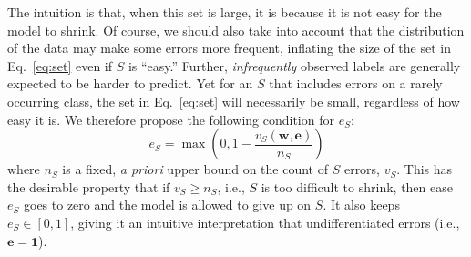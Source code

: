 \documentclass{article} %
\begin{document}
The intuition is that, when this set is large, it is because it is not easy for the
model to shrink.  Of course, we should also take into account 
that the distribution of the data may make some errors more frequent,
inflating the size of the set in Eq.~\ref{eq:set} even if $S$ is ``easy.''
Further,  \emph{infrequently} observed labels are generally
expected to be harder to predict.  Yet for an $S$ that includes errors on
a  rarely occurring class, the set in Eq.~\ref{eq:set} will
necessarily be small, regardless of how easy it is.
We therefore propose the following condition for $e_S$:
\begin{equation}
e_S = \max\left( 0, 1 - \frac{v_S(\mathbf{w}, \mathbf{e}) }{n_S}\right) \label{e-condition}
\end{equation}
where $n_S$ is a fixed, \emph{a priori} upper bound on the count of
$S$ errors, $v_S$.   This
has the desirable property that  if $v_S \ge n_S$,  i.e., $S$ is too
difficult to shrink, then ease $e_S$ goes to zero and the model is
allowed to give up on $S$.  It also keeps $e_S \in [0,1]$, giving it
an intuitive interpretation that undifferentiated errors (i.e., $\mathbf{e}=\boldsymbol{1}$).



\end{document}

